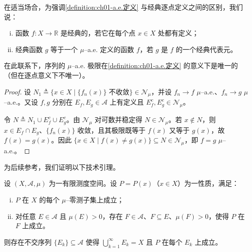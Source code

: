 \documentclass[../../main.tex]{subfiles}%
\begin{document}
在适当场合，为强调\cref{definition:ch01-a.e.定义} 与经典逐点定义之间的区别，我们说：
\begin{enumerate}[(i)]
\item 函数 $f:X\to\mathbb{R}$ 是经典的，若它在每个点 $x\in X$ 处都有定义；
\item 经典函数 $g$ 等于一个 $\mu$--a.e. 定义的函数 $f$，若 $g$ 是 $f$ 的一个经典代表元。
\end{enumerate}

在此联系下，序列的 $\mu$--a.e. 极限在\cref{definition:ch01-a.e.定义} 的意义下是唯一的（但在逐点意义下不唯一）。

\begin{proof}
设 $N_1\triangleq\{x\in X\mid\{f_n(x)\}\text{ 不收敛}\}\in\mathcal{N}_\mu$，并设 $f_n\to f$ $\mu$--a.e.、$f_n\to g$ $\mu$--a.e.。又设 $f,g$ 分别在 $E_f,E_g\in\mathcal{A}$ 上有定义且 $E_f^c,E_g^c\in\mathcal{N}_\mu$。

令 $N\triangleq N_1\cup E_f^c\cup E_g^c$。由 $\mathcal{N}_\mu$ 对可数并稳定得 $N\in\mathcal{N}_\mu$。若 $x\notin N$，则 $x\in E_f\cap E_g$、$\{f_n(x)\}$ 收敛，且其极限既等于 $f(x)$ 又等于 $g(x)$，故 $f(x)=g(x)$。因此 $\{x\in X\mid f(x)\neq g(x)\}\subseteq N\in\mathcal{N}_\mu$，即 $f=g$ $\mu$--a.e.。
\end{proof}

为后续参考，我们证明以下技术引理。

\begin{lemma}[耗竭引理]\label{lemma:ch01-穷尽引理}\label{lemma:ch01-穷竭}
设 $(X,\mathcal{A},\mu)$ 为一有限测度空间。设 $P=P(x)$（$x\in X$）为一性质，满足：
\begin{enumerate}[(i)]
\item $P$ 在 $X$ 的每个 $\mu$--零测子集上成立；
\item 对任意 $E\in\mathcal{A}$ 且 $\mu(E)>0$，存在 $F\in\mathcal{A}$、$F\subseteq E$、$\mu(F)>0$，使得 $P$ 在 $F$ 上成立。
\end{enumerate}
则存在不交序列 $\{E_k\}\subseteq\mathcal{A}$ 使得 $\bigcup_{k=1}^\infty E_k=X$ 且 $P$ 在每个 $E_k$ 上成立。
\end{lemma}
\end{document}
